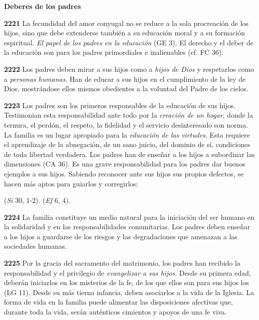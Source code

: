 \begin{body}
\begin{body}
\textbf{Deberes de los padres}

\textbf{2221} La fecundidad del amor conyugal no se reduce a la sola procreación de los hijos, sino que debe extenderse también a su educación moral y a su formación espiritual. \emph{El papel de los padres en la educación}  (GE 3). El derecho y el deber de la educación son para los padres primordiales e inalienables (cf. FC 36).

\textbf{2222} Los padres deben mirar a sus hijos como a \emph{hijos de Dios} y respetarlos como a \emph{personas humanas}. Han de educar a sus hijos en el cumplimiento de la ley de Dios, mostrándose ellos mismos obedientes a la voluntad del Padre de los cielos.

\textbf{2223} Los padres son los primeros responsables de la educación de sus hijos. Testimonian esta responsabilidad ante todo por la \emph{creación de un hogar}, donde la ternura, el perdón, el respeto, la fidelidad y el servicio desinteresado son norma. La familia es un lugar apropiado para la \emph{educación de las virtudes}. Esta requiere el aprendizaje de la abnegación, de un sano juicio, del dominio de sí, condiciones de toda libertad verdadera. Los padres han de enseñar a los hijos a subordinar las dimensiones  (CA 36). Es una grave responsabilidad para los padres dar buenos ejemplos a sus hijos. Sabiendo reconocer ante sus hijos sus propios defectos, se hacen más aptos para guiarlos y corregirlos:

 (\emph{Si} 30, 1-2).  (\emph{Ef} 6, 4).

\textbf{2224} La familia constituye un medio natural para la iniciación del ser humano en la solidaridad y en las responsabilidades comunitarias. Los padres deben enseñar a los hijos a guardarse de los riesgos y las degradaciones que amenazan a las sociedades humanas.

\textbf{2225} Por la gracia del sacramento del matrimonio, los padres han recibido la responsabilidad y el privilegio de \emph{evangelizar a sus hijos}. Desde su primera edad, deberán iniciarlos en los misterios de la fe, de los que ellos son para sus hijos los  (LG 11). Desde su más tierna infancia, deben asociarlos a la vida de la Iglesia. La forma de vida en la familia puede alimentar las disposiciones afectivas que, durante toda la vida, serán auténticos cimientos y apoyos de una fe viva.


\end{body}
\end{body}
